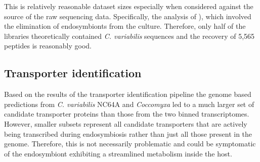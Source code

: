 This is relatively reasonable dataset sizes especially
when considered against the source of the raw sequencing data.
Specifically, the analysis of \citep{Kodama2014}), which
involved the elimination of endosymbionts from the culture.
Therefore, only half of the libraries theoretically contained
\textit{C. variabilis} sequences and the recovery of 5,565 peptides
is reasonably good.


\subsection{Transporter identification}
\begin{table}
    \centering

    \caption[Summary of Predicted Transporters Across Algal Sequences]{Summary
        of the sizes of the complete transporter complements identified in the 
        various algal sequence sets. The two genome based predicted proteomes
        generated much larger predicted sets of proteins (\textit{C. variabilis} NC64A
    and \textit{C. subellipsoidea} C-169).}
\end{table}

Based on the results of the transporter identification pipeline the 
genome based predictions from \textit{C. variabilis} NC64A and \textit{Coccomyxa}
led to a much larger set of candidate
transporter proteins than those from the two binned transcriptomes.
However, smaller subsets represent all 
candidate transporters
that are actively being transcribed during endosymbiosis rather than just
all those present in the genome. Therefore, this is not necessarily problematic
and could be symptomatic of the endosymbiont exhibiting a streamlined
metabolism inside the host.


